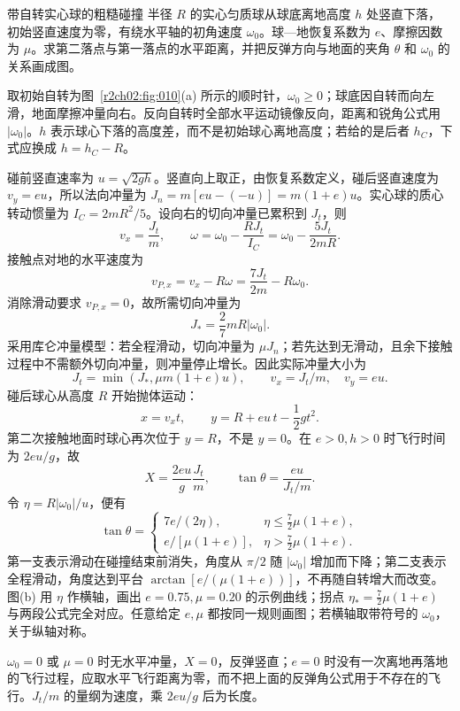 \begin{practicebox}{带自转实心球的粗糙碰撞}
半径 $R$ 的实心匀质球从球底离地高度 $h$ 处竖直下落，初始竖直速度为零，有绕水平轴的初角速度 $\omega_0$。球—地恢复系数为 $e$、摩擦因数为 $\mu$。求第二落点与第一落点的水平距离，并把反弹方向与地面的夹角 $\theta$ 和 $\omega_0$ 的关系画成图。
\label{r2ch02:pr:018}
\begin{solution}
取初始自转为图~\ref{r2ch02:fig:010}(a) 所示的顺时针，$\omega_0\geqslant0$；球底因自转而向左滑，地面摩擦冲量向右。反向自转时全部水平运动镜像反向，距离和锐角公式用 $|\omega_0|$。$h$ 表示球心下落的高度差，而不是初始球心离地高度；若给的是后者 $h_C$，下式应换成 $h=h_C-R$。

碰前竖直速率为 $u=\sqrt{2gh}$。竖直向上取正，由恢复系数定义，碰后竖直速度为 $v_y=eu$，所以法向冲量为
$J_n=m[eu-(-u)]=m(1+e)u$。实心球的质心转动惯量为 $I_C=2mR^2/5$。设向右的切向冲量已累积到 $J_t$，则
\[
 v_x=\frac{J_t}{m},\qquad
 \omega=\omega_0-\frac{RJ_t}{I_C}
       =\omega_0-\frac{5J_t}{2mR}.
\]
接触点对地的水平速度为
\[
 v_{P,x}=v_x-R\omega=\frac{7J_t}{2m}-R\omega_0.
\]
消除滑动要求 $v_{P,x}=0$，故所需切向冲量为
\[
 J_* =\frac{2}{7}mR|\omega_0|.
\]
采用库仑冲量模型：若全程滑动，切向冲量为 $\mu J_n$；若先达到无滑动，且余下接触过程中不需额外切向冲量，则冲量停止增长。因此实际冲量大小为
\[
 J_t=\min\!\left(J_*,\mu m(1+e)u\right),\qquad v_x=J_t/m,\quad v_y=eu.
\]
碰后球心从高度 $R$ 开始抛体运动：
\[
 x=v_xt,\qquad y=R+eu\,t-\frac12gt^2.
\]
第二次接触地面时球心再次位于 $y=R$，不是 $y=0$。在 $e>0,h>0$ 时飞行时间为 $2eu/g$，故
\[
 \boxed{X=\frac{2eu}{g}\frac{J_t}{m}},\qquad
 \boxed{\tan\theta=\frac{eu}{J_t/m}}.
\]
令 $\eta=R|\omega_0|/u$，便有
\[
 \tan\theta=
 \begin{cases}
  7e/(2\eta),&\eta\le\frac72\mu(1+e),\\[2pt]
  e/[\mu(1+e)],&\eta>\frac72\mu(1+e).
\end{cases}
\]
\figSphereBounce
第一支表示滑动在碰撞结束前消失，角度从 $\pi/2$ 随 $|\omega_0|$ 增加而下降；第二支表示全程滑动，角度达到平台 $\arctan[e/(\mu(1+e))]$，不再随自转增大而改变。图(b) 用 $\eta$ 作横轴，画出 $e=0.75,\mu=0.20$ 的示例曲线；拐点 $\eta_*=\tfrac72\mu(1+e)$ 与两段公式完全对应。任意给定 $e,\mu$ 都按同一规则画图；若横轴取带符号的 $\omega_0$，关于纵轴对称。

$\omega_0=0$ 或 $\mu=0$ 时无水平冲量，$X=0$，反弹竖直；$e=0$ 时没有一次离地再落地的飞行过程，应取水平飞行距离为零，而不把上面的反弹角公式用于不存在的飞行。$J_t/m$ 的量纲为速度，乘 $2eu/g$ 后为长度。
\end{solution}
\end{practicebox}

